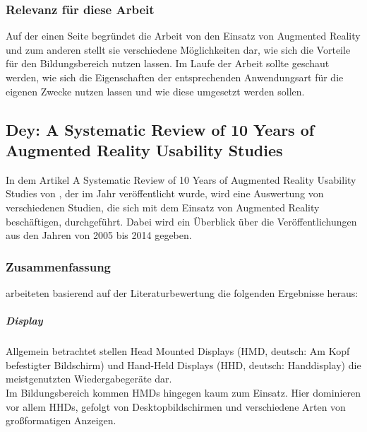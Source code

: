 \subsubsection{Relevanz für diese Arbeit}
Auf der einen Seite begründet die Arbeit von \citeauthor{diegmann:benefits-ar} den Einsatz von Augmented Reality und zum anderen stellt sie verschiedene Möglichkeiten dar, wie sich die Vorteile für den Bildungsbereich nutzen lassen. Im Laufe der Arbeit sollte geschaut werden, wie sich die Eigenschaften der entsprechenden Anwendungsart für die eigenen Zwecke nutzen lassen und wie diese umgesetzt werden sollen.


\subsection{Dey: A Systematic Review of 10 Years of Augmented Reality Usability Studies}
In dem Artikel \glqq  A Systematic Review of 10 Years of Augmented Reality Usability Studies\grqq{} von \citeauthor{dey:review-of-ar-studies}, der im Jahr \citeyear{dey:review-of-ar-studies} veröffentlicht wurde, wird eine Auswertung von verschiedenen Studien, die sich mit dem Einsatz von Augmented Reality beschäftigen, durchgeführt. Dabei wird ein Überblick über die Veröffentlichungen aus den Jahren von 2005 bis 2014 gegeben.

\subsubsection{Zusammenfassung}
\citeauthor{dey:review-of-ar-studies} arbeiteten basierend auf der Literaturbewertung die folgenden Ergebnisse heraus:

\subparagraph{Display}
Allgemein betrachtet stellen Head Mounted Displays (HMD, deutsch: \glqq Am Kopf befestigter Bildschirm\grqq ) und Hand-Held Displays (HHD, deutsch: \glqq Handdisplay\grqq ) die meistgenutzten Wiedergabegeräte dar.\\
Im Bildungsbereich kommen HMDs hingegen kaum zum Einsatz. Hier dominieren vor allem HHDs, gefolgt von Desktopbildschirmen und  verschiedene Arten von großformatigen Anzeigen. \citep[Kapitel 3.7]{dey:review-of-ar-studies}

